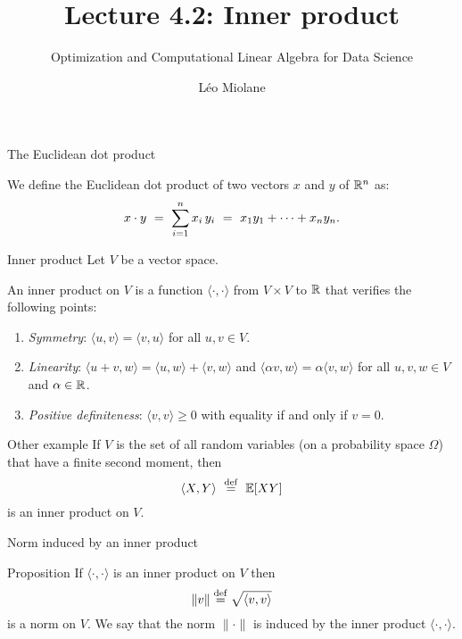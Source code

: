 \documentclass{beamer}
\title{Lecture 4.2: Inner product}
\subtitle{Optimization and Computational Linear Algebra for Data Science}
\author{Léo Miolane}
\date{}
\begin{document}
\setcounter{showProgressBar}{0}
\setcounter{showSlideNumbers}{0}

\frame{\titlepage}

\setcounter{framenumber}{0}
\setcounter{showSlideNumbers}{1}
\begin{frame}[t]{The Euclidean dot product}
	\vspace{-0.3cm}
	\begin{definition}
		We define the Euclidean dot product of two vectors $x$ and $y$ of $\mathbb{R}^n$ as:
		\vspace{-0.3cm}
		$$
		x \cdot y  \ = \ \sum_{i=1}^n x_i \, y_i \ = \ x_1 y_1 + \cdots + x_n y_n.
		\vspace{-0.3cm}
		$$
	\end{definition}
\end{frame}

\begin{frame}[t]{Inner product}
	Let $V$ be a vector space.
	\begin{definition}
		An inner product on $V$ is a function $\langle \cdot, \cdot \rangle$ from $V \times V$ to $\mathbb{R}$ that verifies the following points:
		\begin{enumerate}
			\item \emph{Symmetry}: $\langle u, v \rangle = \langle v, u\rangle$ for all $u,v \in V$.
			\item \emph{Linearity}: $\langle u+v, w \rangle = \langle u, w\rangle + \langle v, w\rangle$ and $\langle \alpha v, w \rangle = \alpha \langle v, w \rangle$ for all $u,v,w \in V$ and $\alpha \in \mathbb{R}$.
			\item \emph{Positive definiteness}: $\langle v, v\rangle \geq 0$ with equality if and only if $v = 0$.
		\end{enumerate}
	\end{definition}
\end{frame}


\begin{frame}[t]{Other example}
	If $V$ is the set of all random variables (on a probability space $\Omega$) that have a finite second moment, then 
	$$\langle X, Y \rangle \ \overset{\rm def}{=}  \ \mathbb{E}[XY]$$
	is an inner product on $V$.
\end{frame}

\begin{frame}[t]{Norm induced by an inner product}
	\vspace{-0.3cm}
	\begin{block}{Proposition}
		If $\langle \cdot, \cdot \rangle$ is an inner product on $V$ then 
		$$
		\| v \| \overset{\rm def}{=} \sqrt{\langle v, v \rangle}
		$$ 
		is a norm on $V$. We say  that the norm $\| \cdot \|$ is induced by the inner product $\langle \cdot, \cdot \rangle$.
	\end{block}
\end{frame}
\end{document}
